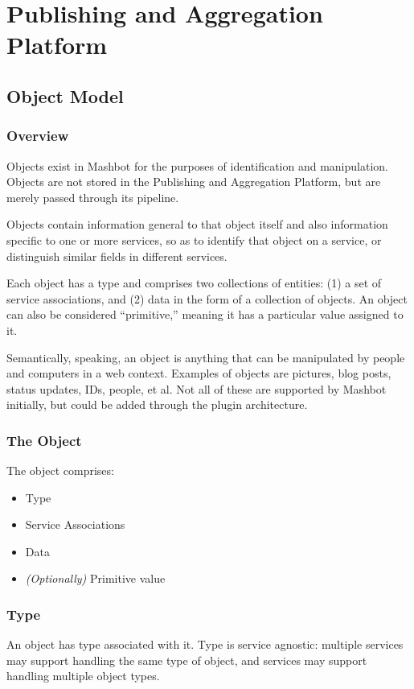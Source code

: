 \documentclass{report}
\begin{document}
\chapter{Publishing and Aggregation Platform}
	\section{Object Model}
		\subsection{Overview}
			Objects exist in Mashbot for the purposes of identification and 
			manipulation. Objects are not stored in the Publishing and 
			Aggregation Platform, but are merely passed through its pipeline.

			Objects contain information general to that object itself and also 
			information specific to one or more services, so as to
			identify that object on a service, or distinguish similar fields in 
			different services.

			Each object has a type and comprises two collections of entities:
			(1) a set of service associations, and (2) data in the form of a 
			collection of objects.  An object can also be considered 
			``primitive,'' meaning it has a particular value assigned to it.

			Semantically, speaking, an object is anything that can be 
			manipulated by people and computers in a web context.  Examples of 
			objects are pictures, blog posts, status updates, IDs, people, et 
			al.  Not all of these are supported by Mashbot initially, but could 
			be added through the plugin architecture.

		\subsection{The Object}
			The object comprises:
			\begin{itemize}
			\item Type
			\item Service Associations
			\item Data
			\item \emph{(Optionally)} Primitive value
			\end{itemize}

		\subsection{Type}
			An object has type associated with it. Type is service agnostic:
			multiple services may support handling the same type of object,
			and services may support handling multiple object types.
\end{document}
